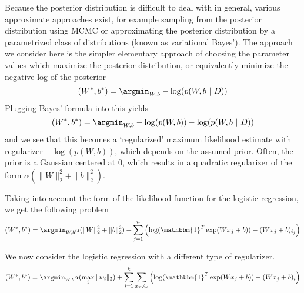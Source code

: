 Because the posterior distribution is difficult to deal with in general, various approximate approaches exist, for example
sampling from the posterior distribution using MCMC or approximating the posterior distribution by a parametrized class
of distributions (known as variational Bayes'). The approach we consider here is the simpler elementary approach of
choosing the parameter values which maximize the posterior distribution, or equivalently minimize the negative log of the
posterior
\begin{equation}
 (W^*,b^*) = \argmin_{W, b} -\log(p(W, b~|~D))
\end{equation}
Plugging Bayes' formula into this yields
\begin{equation}
 (W^*,b^*) = \argmin_{W, b} -\log(p(W,b)) - \log(p(W, b~|~D))
\end{equation}
and we see that this becomes a `regularized' maximum likelihood estimate with regularizer $-\log(p(W,b))$,
which depends on the assumed prior. Often, the prior is a Gaussian centered at $0$, which results in a quadratic regularizer
of the form $\alpha (\|W\|_2^2 + \|b\|_2^2)$. 

Taking into account the form of the likelihood function for the
logistic regression, we get the following problem
\begin{equation}
 (W^*,b^*) = \argmin_{W, b} \alpha (\|W\|_2^2 + \|b\|_2^2) + \displaystyle\sum_{j=1}^n \left(\log(\mathbbm{1}^T\exp(W x_j + b)) - 
 (W x_j + b)_{i_j}\right)
\end{equation}

We now consider the logistic regression with a different type of regularizer.
\begin{equation}
 (W^*,b^*) = \argmin_{W, b} \alpha (\max_i \|w_i\|_2) + \displaystyle\sum_{i=1}^k \displaystyle\sum_{x\in A_i} 
 \left(\log(\mathbbm{1}^T\exp(W x_j + b)) - (W x_j + b)_i\right)
\end{equation}





